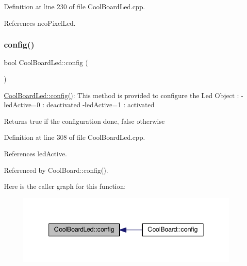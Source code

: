 Definition at line 230 of file Cool\+Board\+Led.\+cpp.



References neo\+Pixel\+Led.

\mbox{\label{class_cool_board_led_a1b60e5e30bea96c49ed62ed1bf1ffc8b}} 
\subsubsection{\texorpdfstring{config()}{config()}}
{\footnotesize\ttfamily bool Cool\+Board\+Led\+::config (\begin{DoxyParamCaption}{ }\end{DoxyParamCaption})}

\hyperlink{class_cool_board_led_a1b60e5e30bea96c49ed62ed1bf1ffc8b}{Cool\+Board\+Led\+::config()}\+: This method is provided to configure the Led Object \+: -\/led\+Active=0 \+: deactivated -\/led\+Active=1 \+: activated \begin{DoxyReturn}{Returns}
true if the configuration done, false otherwise 
\end{DoxyReturn}


Definition at line 308 of file Cool\+Board\+Led.\+cpp.



References led\+Active.



Referenced by Cool\+Board\+::config().

Here is the caller graph for this function\+:
\nopagebreak
\begin{figure}[H]
\begin{center}
\leavevmode
\includegraphics[width=321pt]{de/dc0/class_cool_board_led_a1b60e5e30bea96c49ed62ed1bf1ffc8b_icgraph}
\end{center}
\end{figure}
\mbox{\label{class_cool_board_led_ae74fe4b47d06c3a97b468ba220c4eb99}} 
